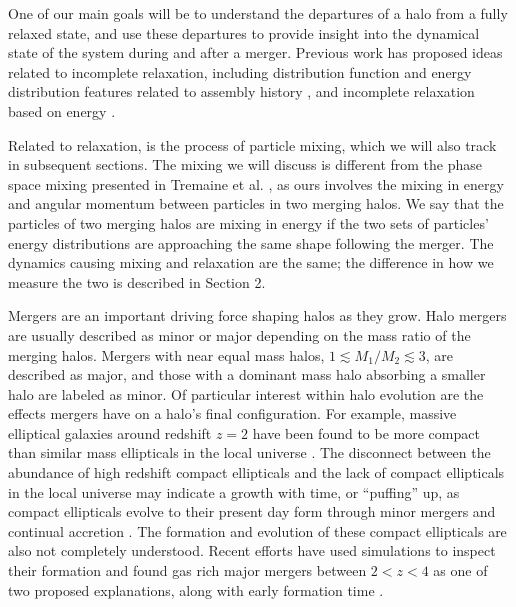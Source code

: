\documentclass[a4paper,11pt]{article}
\begin{document}
One of our main 
goals will be to understand the departures of a halo from a fully relaxed state, and use these departures to provide insight into the dynamical state of the 
system during and after a merger.  Previous work has proposed ideas related to incomplete relaxation, including distribution function and energy distribution 
features related to assembly history \citep{Vog09}, and incomplete relaxation based on energy \citep{Hjo91}.

Related to relaxation, is the process of particle mixing, which we will also track in subsequent sections.  The mixing we will discuss is 
different from the phase space mixing presented in Tremaine et al. \citep{Tre86}, as ours involves the mixing in energy and angular momentum between particles in two merging 
halos.  We say that the particles of two merging halos are mixing in energy if the two sets of particles' energy distributions are approaching the same shape 
following the merger.  The dynamics causing mixing and relaxation are the same; the difference in how we measure the two is described in Section 2.

Mergers are an important driving force shaping halos as they grow.  Halo mergers are 
usually described as minor or major depending on the mass ratio of the merging halos.  Mergers with near equal mass halos, $1\lesssim M_1/M_2\lesssim3$, are 
described as major, and those with a dominant mass halo absorbing a smaller halo are labeled as minor.
Of particular interest within halo evolution are the effects mergers have on a halo's final configuration.  For example, massive elliptical galaxies around redshift $z=2$ 
have been found to be more compact than similar mass ellipticals in the local universe \citep{Tru07, Bui08, Cim08, van08,Tof14}. The disconnect between the abundance of high redshift 
compact ellipticals and the lack of compact ellipticals in the local universe may indicate a growth with time, or ``puffing'' up, as compact ellipticals 
evolve to their present day form through minor mergers and continual accretion \citep{van08,Naa09, Bar13}.  The formation and evolution 
of these compact ellipticals are also not completely understood.  Recent efforts have used simulations to inspect their formation and found gas 
rich major mergers between $2<z<4$ as one of two proposed explanations, along with early formation time \citep{Wel15}. 
\end{document}
